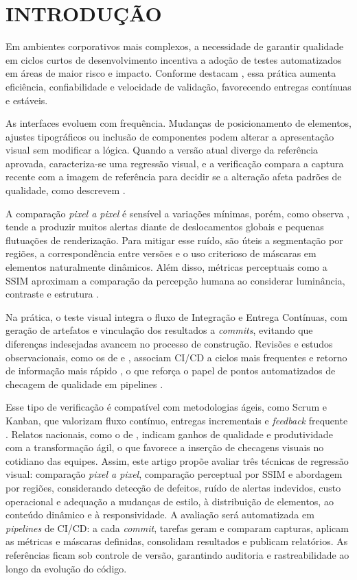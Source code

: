 \documentclass{UNESC}
\begin{document}
\section{INTRODUÇÃO}
{
Em ambientes corporativos mais complexos, a necessidade de garantir qualidade em ciclos curtos de desenvolvimento incentiva a adoção de testes automatizados em áreas de maior risco e impacto. Conforme destacam , essa prática aumenta eficiência, confiabilidade e velocidade de validação, favorecendo entregas contínuas e estáveis.

As interfaces evoluem com frequência. Mudanças de posicionamento de elementos, ajustes tipográficos ou inclusão de componentes podem alterar a apresentação visual sem modificar a lógica. Quando a versão atual diverge da referência aprovada, caracteriza-se uma regressão visual, e a verificação compara a captura recente com a imagem de referência para decidir se a alteração afeta padrões de qualidade, como descrevem .

A comparação \emph{pixel a pixel} é sensível a variações mínimas, porém, como observa , tende a produzir muitos alertas diante de deslocamentos globais e pequenas flutuações de renderização. Para mitigar esse ruído, são úteis a segmentação por regiões, a correspondência entre versões e o uso criterioso de máscaras em elementos naturalmente dinâmicos. Além disso, métricas perceptuais como a SSIM aproximam a comparação da percepção humana ao considerar luminância, contraste e estrutura \cite{wang2004,wang2003msssim}.

Na prática, o teste visual integra o fluxo de Integração e Entrega Contínuas, com geração de artefatos e vinculação dos resultados a \emph{commits}, evitando que diferenças indesejadas avancem no processo de construção. Revisões e estudos observacionais, como os de  e , associam CI/CD a ciclos mais frequentes e retorno de informação mais rápido \cite{regoneto2021,silva2023ic}, o que reforça o papel de pontos automatizados de checagem de qualidade em pipelines \cite{maia2024}.

Esse tipo de verificação é compatível com metodologias ágeis, como Scrum e Kanban, que valorizam fluxo contínuo, entregas incrementais e \emph{feedback} frequente \cite{bessa2018}. Relatos nacionais, como o de , indicam ganhos de qualidade e produtividade com a transformação ágil, o que favorece a inserção de checagens visuais no cotidiano das equipes. Assim, este artigo propõe avaliar três técnicas de regressão visual: comparação \emph{pixel a pixel}, comparação perceptual por SSIM e abordagem por regiões, considerando detecção de defeitos, ruído de alertas indevidos, custo operacional e adequação a mudanças de estilo, à distribuição de elementos, ao conteúdo dinâmico e à responsividade. A avaliação será automatizada em \emph{pipelines} de CI/CD: a cada \emph{commit}, tarefas geram e comparam capturas, aplicam as métricas e máscaras definidas, consolidam resultados e publicam relatórios. As referências ficam sob controle de versão, garantindo auditoria e rastreabilidade ao longo da evolução do código.
}
\end{document}
